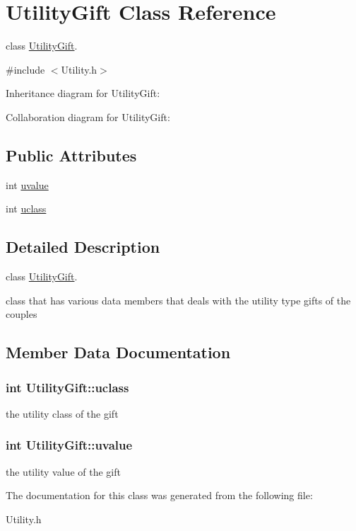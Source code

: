 \hypertarget{classUtilityGift}{}\section{Utility\+Gift Class Reference}
\label{classUtilityGift}


class \hyperlink{classUtilityGift}{Utility\+Gift}.  




{\ttfamily \#include $<$Utility.\+h$>$}



Inheritance diagram for Utility\+Gift\+:


Collaboration diagram for Utility\+Gift\+:
\subsection*{Public Attributes}
\begin{DoxyCompactItemize}
\item 
int \hyperlink{classUtilityGift_aced75fae44dd0873af8ecdbc52f0e3ab}{uvalue}
\item 
int \hyperlink{classUtilityGift_adfcf4dd059284e0a3b33e26b5274f4c0}{uclass}
\end{DoxyCompactItemize}


\subsection{Detailed Description}
class \hyperlink{classUtilityGift}{Utility\+Gift}. 

class that has various data members that deals with the utility type gifts of the couples 

\subsection{Member Data Documentation}
\subsubsection[{\texorpdfstring{uclass}{uclass}}]{\setlength{\rightskip}{0pt plus 5cm}int Utility\+Gift\+::uclass}\hypertarget{classUtilityGift_adfcf4dd059284e0a3b33e26b5274f4c0}{}\label{classUtilityGift_adfcf4dd059284e0a3b33e26b5274f4c0}
the utility class of the gift 
\subsubsection[{\texorpdfstring{uvalue}{uvalue}}]{\setlength{\rightskip}{0pt plus 5cm}int Utility\+Gift\+::uvalue}\hypertarget{classUtilityGift_aced75fae44dd0873af8ecdbc52f0e3ab}{}\label{classUtilityGift_aced75fae44dd0873af8ecdbc52f0e3ab}
the utility value of the gift 

The documentation for this class was generated from the following file\+:\begin{DoxyCompactItemize}
\item 
Utility.\+h\end{DoxyCompactItemize}
